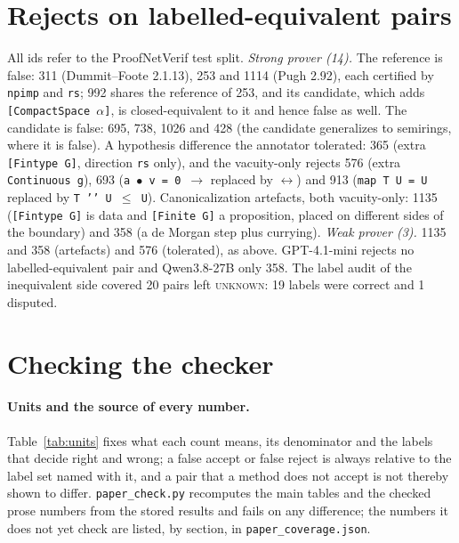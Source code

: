 \documentclass[10pt]{article}
\theoremstyle{definition}
\newcommand{\V}[1]{\textsc{#1}}
\begin{document}
\section{Rejects on labelled-equivalent pairs}\label{app:rejects}

All ids refer to the ProofNetVerif test split.
\emph{Strong prover (14).} The reference is false: 311 (Dummit--Foote 2.1.13), 253 and 1114
(Pugh 2.92), each certified by \texttt{npimp} and \texttt{rs}; 992 shares the reference of 253, and
its candidate, which adds \texttt{[CompactSpace $\alpha$]}, is closed-equivalent to it and hence
false as well. The candidate is false: 695, 738, 1026 and 428 (the candidate generalizes to
semirings, where it is false). A hypothesis difference the annotator tolerated: 365 (extra
\texttt{[Fintype G]}, direction \texttt{rs} only), and the vacuity-only rejects 576 (extra
\texttt{Continuous g}), 693 (\texttt{a $\bullet$ v = 0 $\to$} replaced by $\leftrightarrow$) and 913
(\texttt{map T U = U} replaced by \texttt{T '{}' U $\le$ U}). Canonicalization artefacts, both
vacuity-only: 1135 (\texttt{[Fintype G]} is data and \texttt{[Finite G]} a proposition, placed on
different sides of the boundary) and 358 (a de Morgan step plus currying).
\emph{Weak prover (3).} 1135 and 358 (artefacts) and 576 (tolerated), as above.
GPT-4.1-mini rejects no labelled-equivalent pair and Qwen3.8-27B only 358.
The label audit of the inequivalent side covered 20 pairs left \V{unknown}: 19 labels were
correct and 1 disputed.

\section{Checking the checker}\label{app:repro}



\paragraph{Units and the source of every number.} Table~\ref{tab:units} fixes what each count
means, its denominator and the labels that decide right and wrong; a false accept or false
reject is always relative to the label set named with it, and a pair that a method does not
accept is not thereby shown to differ. \texttt{paper\_check.py} recomputes the main tables and the
checked prose numbers from the stored results and fails on any difference; the numbers it does
not yet check are listed, by section, in \texttt{paper\_coverage.json}.
\end{document}
